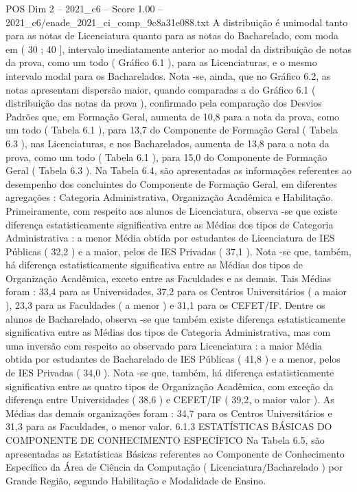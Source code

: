\begin{textsample}{POS Dim 2 – 2021\_c6 – Score 1.00 – 2021\_c6/enade\_2021\_ci\_comp\_9c8a31e088.txt}
A distribuição é unimodal tanto para as notas de Licenciatura quanto para as notas do Bacharelado, com moda em ( 30 ; 40 ], intervalo imediatamente anterior ao modal da distribuição de notas da prova, como um todo ( Gráfico 6.1 ), para as Licenciaturas, e o mesmo intervalo modal para os Bacharelados.
Nota -se, ainda, que no Gráfico 6.2, as notas apresentam dispersão maior, quando comparadas a do Gráfico 6.1 ( distribuição das notas da prova ), confirmado pela comparação dos Desvios Padrões que, em Formação Geral, aumenta de 10,8 para a nota da prova, como um todo ( Tabela 6.1 ), para 13,7 do Componente de Formação Geral ( Tabela 6.3 ), nas Licenciaturas, e nos Bacharelados, aumenta de 13,8 para a nota da prova, como um todo ( Tabela 6.1 ), para 15,0 do Componente de Formação Geral ( Tabela 6.3 ).
Na Tabela 6.4, são apresentadas as informações referentes ao desempenho dos concluintes do Componente de Formação Geral, em diferentes agregações : Categoria Administrativa, Organização Acadêmica e Habilitação.
Primeiramente, com respeito aos alunos de Licenciatura, observa -se que existe diferença estatisticamente significativa entre as Médias dos tipos de Categoria Administrativa : a menor Média obtida por estudantes de Licenciatura de IES Públicas ( 32,2 ) e a maior, pelos de IES Privadas ( 37,1 ).
Nota -se que, também, há diferença estatisticamente significativa entre as Médias dos tipos de Organização Acadêmica, exceto entre as Faculdades e as demais.
Tais Médias foram : 33,4 para as Universidades, 37,2 para os Centros Universitários ( a maior ), 23,3 para as Faculdades ( a menor ) e 31,1 para os CEFET/IF.
Dentre os alunos de Bacharelado, observa -se que também existe diferença estatisticamente significativa entre as Médias dos tipos de Categoria Administrativa, mas com uma inversão com respeito ao observado para Licenciatura : a maior Média obtida por estudantes de Bacharelado de IES Públicas ( 41,8 ) e a menor, pelos de IES Privadas ( 34,0 ).
Nota -se que, também, há diferença estatisticamente significativa entre as quatro tipos de Organização Acadêmica, com exceção da diferença entre Universidades ( 38,6 ) e CEFET/IF ( 39,2, o maior valor ).
As Médias das demais organizações foram : 34,7 para os Centros Universitários e 31,3 para as Faculdades, o menor valor. 6.1.3 ESTATÍSTICAS BÁSICAS DO COMPONENTE DE CONHECIMENTO ESPECÍFICO Na Tabela 6.5, são apresentadas as Estatísticas Básicas referentes ao Componente de Conhecimento Específico da Área de Ciência da Computação ( Licenciatura/Bacharelado ) por Grande Região, segundo Habilitação e Modalidade de Ensino.

\end{textsample}
